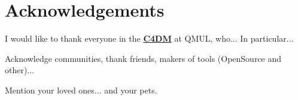 \chapter*{Acknowledgements}

I would like to thank everyone in the \textbf{\href{http://www.eecs.qmul.ac.uk/}{C4DM}} at QMUL, who... In particular...

Acknowledge communities, thank friends, makers of tools (OpenSource and other)...

Mention your loved ones... and your pets.

